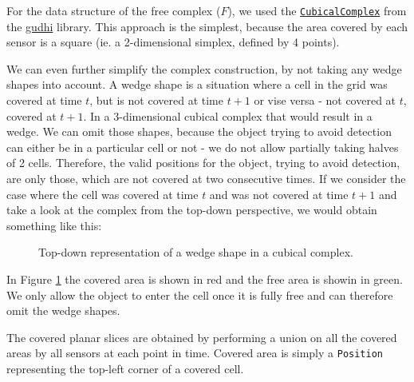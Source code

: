 \documentclass{article}
\begin{document}
For the data structure of the free complex ($F$), we used the \href{https://gudhi.inria.fr/python/latest/cubical_complex_user.html}{\texttt{CubicalComplex}} from the \href{https://pypi.org/project/gudhi/}{gudhi} library.
This approach is the simplest, because the area covered by each sensor is a square (ie. a 2-dimensional simplex, defined by 4 points).

We can even further simplify the complex construction, by not taking any wedge shapes into account.
A wedge shape is a situation where a cell in the grid was covered at time $t$, but is not covered at time $t + 1$ or vise versa - not covered at $t$, covered at $t + 1$.
In a 3-dimensional cubical complex that would result in a wedge.
We can omit those shapes, because the object trying to avoid detection can either be in a particular cell or not - we do not allow partially taking halves of 2 cells.
Therefore, the valid positions for the object, trying to avoid detection, are only those, which are not covered at two consecutive times.
If we consider the case where the cell was covered at time $t$ and was not covered at time $t + 1$ and take a look at the complex from the top-down perspective, we would obtain something like this:

\smallskip

\begin{figure}[H]
  \centering


  \caption{Top-down representation of a wedge shape in a cubical complex.}
  \label{fig:wedge}
\end{figure}

In Figure \ref{fig:wedge} the covered area is shown in red and the free area is showin in green.
We only allow the object to enter the cell once it is fully free and can therefore omit the wedge shapes.

The covered planar slices are obtained by performing a union on all the covered areas by all sensors at each point in time.
Covered area is simply a \texttt{Position} representing the top-left corner of a covered cell.
\end{document}
